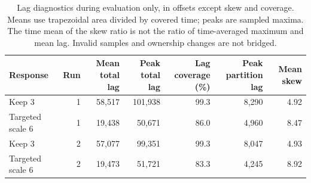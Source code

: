 \begin{table}[!htbp]
\centering\small
\setlength{\tabcolsep}{3pt}
\renewcommand{\arraystretch}{1.12}
\begin{tabular}{@{}lrrrrrr@{}}
\toprule
Response & Run & \shortstack{Mean total\\lag} & \shortstack{Peak total\\lag} & \shortstack{Lag coverage\\(\%)} & \shortstack{Peak partition\\lag} & Mean skew\\
\midrule
Keep 3 & 1 & 58,517 & 101,938 & 99.3 & 8,290 & 4.92\\
Targeted scale 6 & 1 & 19,438 & 50,671 & 86.0 & 4,960 & 8.47\\
Keep 3 & 2 & 57,077 & 99,351 & 99.3 & 8,047 & 4.93\\
Targeted scale 6 & 2 & 19,473 & 51,721 & 83.3 & 4,245 & 8.92\\
\bottomrule
\end{tabular}
\caption{Lag diagnostics during evaluation only, in offsets except skew and coverage. Means use trapezoidal area divided by covered time; peaks are sampled maxima. The time mean of the skew ratio is not the ratio of time-averaged maximum and mean lag. Invalid samples and ownership changes are not bridged.}
\label{tab:short-targeted-scaling-diagnostics}
\end{table}
